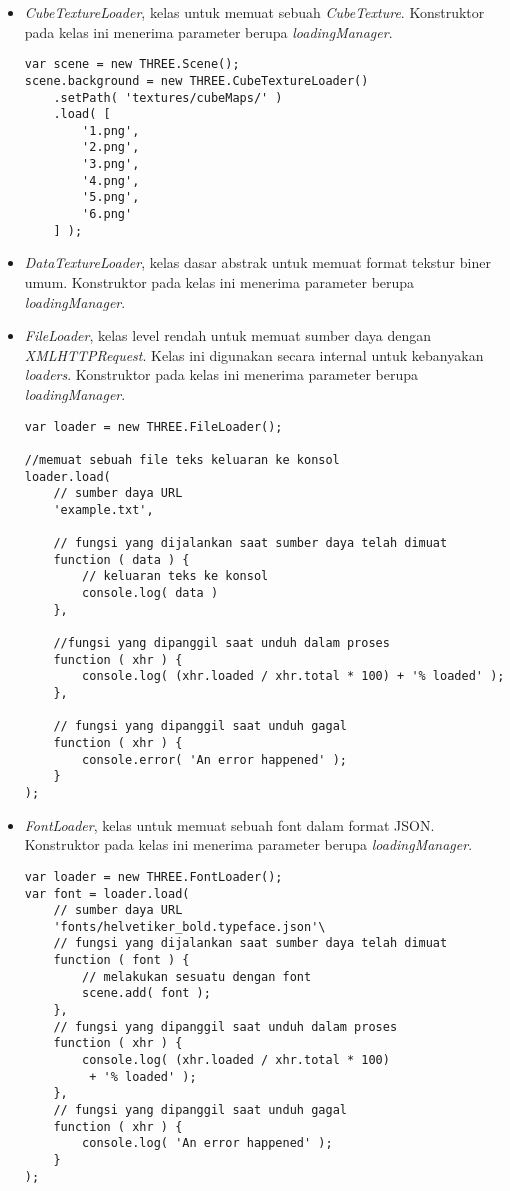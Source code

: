 \begin{itemize}
\begin{itemize}
	\item {\it CubeTextureLoader}, kelas untuk memuat sebuah {\it CubeTexture}. Konstruktor pada kelas ini menerima parameter berupa  {\it loadingManager}.
	
\begin{lstlisting}[caption={Contoh penggunaan kelas {\it CubeTextureLoader} menggunakan gambar dengan format PNG di setiap sisinya.},captionpos=b]
var scene = new THREE.Scene();
scene.background = new THREE.CubeTextureLoader()
	.setPath( 'textures/cubeMaps/' )
	.load( [
		'1.png',
		'2.png',
		'3.png',
		'4.png',
		'5.png',
		'6.png'
	] );
\end{lstlisting}

	\item {\it DataTextureLoader}, kelas dasar abstrak untuk memuat format tekstur biner umum. Konstruktor pada kelas ini menerima parameter berupa  {\it loadingManager}.
	
	\item {\it FileLoader}, kelas level rendah untuk memuat sumber daya dengan {\it XMLHTTPRequest}. Kelas ini digunakan secara internal untuk kebanyakan {\it loaders}. Konstruktor pada kelas ini menerima parameter berupa  {\it loadingManager}.
	
\begin{lstlisting}[caption={Contoh penggunaan kelas {\it FileLoader} untuk berkas dengan format TXT.},captionpos=b]
var loader = new THREE.FileLoader();

//memuat sebuah file teks keluaran ke konsol
loader.load(
    // sumber daya URL
    'example.txt',

    // fungsi yang dijalankan saat sumber daya telah dimuat
    function ( data ) {
        // keluaran teks ke konsol
        console.log( data )
    },

    //fungsi yang dipanggil saat unduh dalam proses
    function ( xhr ) {
        console.log( (xhr.loaded / xhr.total * 100) + '% loaded' );
    },

    // fungsi yang dipanggil saat unduh gagal
    function ( xhr ) {
        console.error( 'An error happened' );
    }
);

\end{lstlisting}

	\item {\it FontLoader}, kelas untuk memuat sebuah font dalam format JSON. Konstruktor pada kelas ini menerima parameter berupa  {\it loadingManager}.
	
\begin{lstlisting}[caption={Contoh penggunaan kelas {\it FontLoader}.},captionpos=b]
var loader = new THREE.FontLoader();
var font = loader.load(
	// sumber daya URL
	'fonts/helvetiker_bold.typeface.json'\
	// fungsi yang dijalankan saat sumber daya telah dimuat
	function ( font ) {
		// melakukan sesuatu dengan font
		scene.add( font );
	},
	// fungsi yang dipanggil saat unduh dalam proses
	function ( xhr ) {
		console.log( (xhr.loaded / xhr.total * 100)
		 + '% loaded' );
	},
	// fungsi yang dipanggil saat unduh gagal
	function ( xhr ) {
		console.log( 'An error happened' );
	}
);
\end{lstlisting}


\end{itemize}
\end{itemize}
